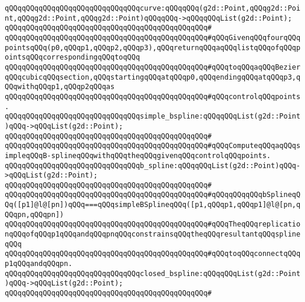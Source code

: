 \verb|qQQqqQQqqQQqqQQqqQQqqQQqqQQqqQQqcurve:qQQqqQQq(g2d::Point,qQQqg2d::Point,qQQqg2d::Point,qQQqg2d::Point)qQQqqQQq->qQQqqQQqList(g2d::Point);|\newline
\verb|qQQqqQQqqQQqqQQqqQQqqQQqqQQqqQQqqQQqqQQqqQQqqQQq#|\newline
\verb|qQQqqQQqqQQqqQQqqQQqqQQqqQQqqQQqqQQqqQQqqQQqqQQq#qQQqGivenqQQqfourqQQqpointsqQQq(p0,qQQqp1,qQQqp2,qQQqp3),qQQqreturnqQQqaqQQqlistqQQqofqQQqpointsqQQqcorrespondingqQQqtoqQQq|\newline
\verb|qQQqqQQqqQQqqQQqqQQqqQQqqQQqqQQqqQQqqQQqqQQqqQQq#qQQqtoqQQqaqQQqBezierqQQqcubicqQQqsection,qQQqstartingqQQqatqQQqp0,qQQqendingqQQqatqQQqp3,qQQqwithqQQqp1,qQQqp2qQQqas|\newline
\verb|qQQqqQQqqQQqqQQqqQQqqQQqqQQqqQQqqQQqqQQqqQQqqQQq#qQQqcontrolqQQqpoints.|\newline
\newline
\newline
\verb|qQQqqQQqqQQqqQQqqQQqqQQqqQQqqQQqsimple_bspline:qQQqqQQqList(g2d::Point)qQQq->qQQqList(g2d::Point);|\newline
\verb|qQQqqQQqqQQqqQQqqQQqqQQqqQQqqQQqqQQqqQQqqQQqqQQq#|\newline
\verb|qQQqqQQqqQQqqQQqqQQqqQQqqQQqqQQqqQQqqQQqqQQqqQQq#qQQqComputeqQQqaqQQqsimpleqQQqB-splineqQQqwithqQQqtheqQQqgivenqQQqcontrolqQQqpoints.|\newline
\newline
\newline
\verb|qQQqqQQqqQQqqQQqqQQqqQQqqQQqqQQqb_spline:qQQqqQQqList(g2d::Point)qQQq->qQQqList(g2d::Point);|\newline
\verb|qQQqqQQqqQQqqQQqqQQqqQQqqQQqqQQqqQQqqQQqqQQqqQQq#|\newline
\verb|qQQqqQQqqQQqqQQqqQQqqQQqqQQqqQQqqQQqqQQqqQQqqQQq#qQQqqQQqqQQqbSplineqQQq([p1]@l@[pn])qQQq===qQQqsimpleBSplineqQQq([p1,qQQqp1,qQQqp1]@l@[pn,qQQqpn,qQQqpn])|\newline
\verb|qQQqqQQqqQQqqQQqqQQqqQQqqQQqqQQqqQQqqQQqqQQqqQQq#qQQqTheqQQqreplicationqQQqofqQQqp1qQQqandqQQqpnqQQqconstrainsqQQqtheqQQqresultantqQQqsplineqQQq|\newline
\verb|qQQqqQQqqQQqqQQqqQQqqQQqqQQqqQQqqQQqqQQqqQQqqQQq#qQQqtoqQQqconnectqQQqp1qQQqandqQQqpn.|\newline
\newline
\newline
\verb|qQQqqQQqqQQqqQQqqQQqqQQqqQQqqQQqclosed_bspline:qQQqqQQqList(g2d::Point)qQQq->qQQqList(g2d::Point);|\newline
\verb|qQQqqQQqqQQqqQQqqQQqqQQqqQQqqQQqqQQqqQQqqQQqqQQq#|\newline
